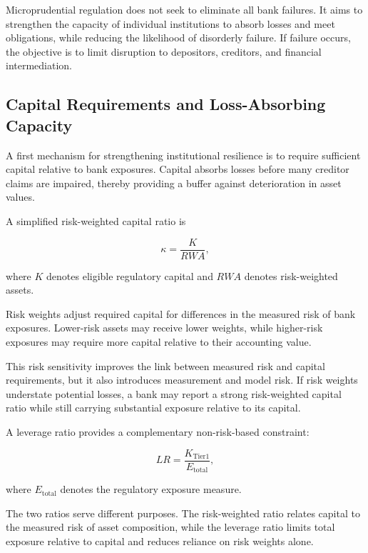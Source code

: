 Microprudential regulation does not seek to eliminate all bank failures. It aims to strengthen the capacity of individual institutions to absorb losses and meet obligations, while reducing the likelihood of disorderly failure. If failure occurs, the objective is to limit disruption to depositors, creditors, and financial intermediation.

\subsection{Capital Requirements and Loss-Absorbing Capacity}

A first mechanism for strengthening institutional resilience is to require sufficient capital relative to bank exposures. Capital absorbs losses before many creditor claims are impaired, thereby providing a buffer against deterioration in asset values.

A simplified risk-weighted capital ratio is

\begin{equation}
\kappa
=\frac{K}{RWA},
\label{eq:ch23-risk-weighted-capital}
\end{equation}

where \(K\) denotes eligible regulatory capital and \(RWA\) denotes risk-weighted assets.

Risk weights adjust required capital for differences in the measured risk of bank exposures. Lower-risk assets may receive lower weights, while higher-risk exposures may require more capital relative to their accounting value.

This risk sensitivity improves the link between measured risk and capital requirements, but it also introduces measurement and model risk. If risk weights understate potential losses, a bank may report a strong risk-weighted capital ratio while still carrying substantial exposure relative to its capital.

A leverage ratio provides a complementary non-risk-based constraint:

\begin{equation}
LR
=\frac{K_{\mathrm{Tier1}}}{E_{\mathrm{total}}},
\label{eq:ch23-leverage-ratio}
\end{equation}

where \(E_{\mathrm{total}}\) denotes the regulatory exposure measure.

The two ratios serve different purposes. The risk-weighted ratio relates capital to the measured risk of asset composition, while the leverage ratio limits total exposure relative to capital and reduces reliance on risk weights alone.

